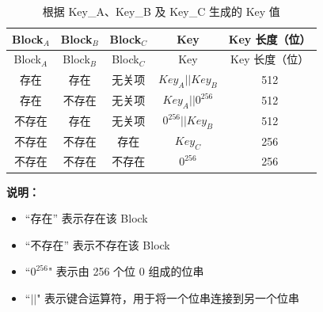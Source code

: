 \begin{longtable}[c]{ |c|c|c|c|c| }
\caption{根据 Key\_A、Key\_B 及 Key\_C 生成的 Key 值}
\label{tab:extmemencr-key-possibility}
\\\hline 
\rowcolor{lightgray}
Block$_A$ & Block$_B$ & Block$_C$ & Key  & Key 长度（位） \\\hline
\endfirsthead
\hline
\rowcolor{lightgray}
Block$_A$ & Block$_B$ & Block$_C$ & Key  & Key 长度（位） \\\hline
\endhead
\endfoot
存在 &   存在   &  无关项    &   \begin{math}\mathit{Key}_{A} || \mathit{Key}_{B}\end{math}    &   512   \\\hline
存在 &   不存在    &  无关项    &   \begin{math}\mathit{Key}_{A} || 0^{256}\end{math}    &   512   \\\hline
不存在  &   存在   &  无关项    &   \begin{math}0^{256} || \mathit{Key}_{B}\end{math}    &   512   \\\hline
不存在  &   不存在    &  存在       &   $\mathit{Key}_{C}$    &   256   \\\hline
不存在  &   不存在    &  不存在        &   $0^{256}$    &   256   \\\hline
\end{longtable}
\vspace{-1.5em}
{\bfseries 说明：}\\
\begin{itemize}
    \item “存在” 表示存在该 Block
    \item “不存在” 表示不存在该 Block
    \item ``$0^{256}$" 表示由 256 个位 0 组成的位串
    \item ``\begin{math}||\end{math}" 表示键合运算符，用于将一个位串连接到另一个位串
\end{itemize}
